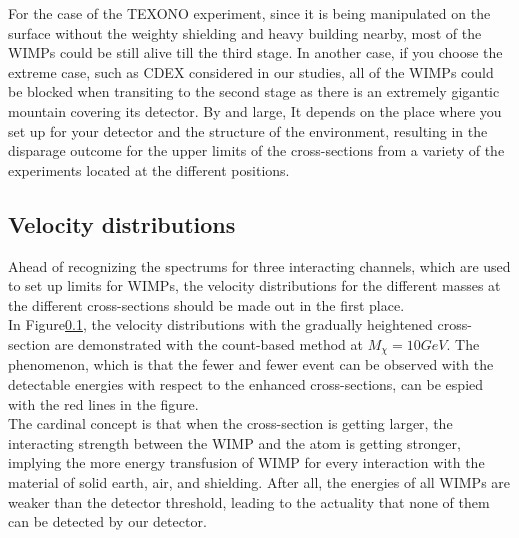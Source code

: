 For the case of the TEXONO experiment, since it is being manipulated on the surface without the weighty shielding and heavy building nearby, most of the WIMPs could be still alive till the third stage. In another case, if you choose the extreme case, such as CDEX considered in our studies, all of the WIMPs could be blocked when transiting to the second stage as there is an extremely gigantic mountain covering its detector. By and large, It depends on the place where you set up for your detector and the structure of the environment, resulting in the disparage outcome for the upper limits of the cross-sections from a variety of the experiments located at the different positions. \\ 

\subsection{Velocity distributions}
Ahead of recognizing the spectrums for three interacting channels, which are used to set up limits for WIMPs, the velocity distributions for the different masses at the different cross-sections should be made out in the first place.\\ 

In Figure\ref{}, the velocity distributions with the gradually heightened cross-section are demonstrated with the count-based method at $M_{\chi}=10GeV$. The phenomenon, which is that the fewer and fewer event can be observed with the detectable energies with respect to the enhanced cross-sections, can be espied with the red lines in the figure.\\ 

The cardinal concept is that when the cross-section is getting larger, the interacting strength between the WIMP and the atom is getting stronger, implying the more energy transfusion of WIMP for every interaction with the material of solid earth, air, and shielding. After all, the energies of all WIMPs are weaker than the detector threshold, leading to the actuality that none of them can be detected by our detector. \\

